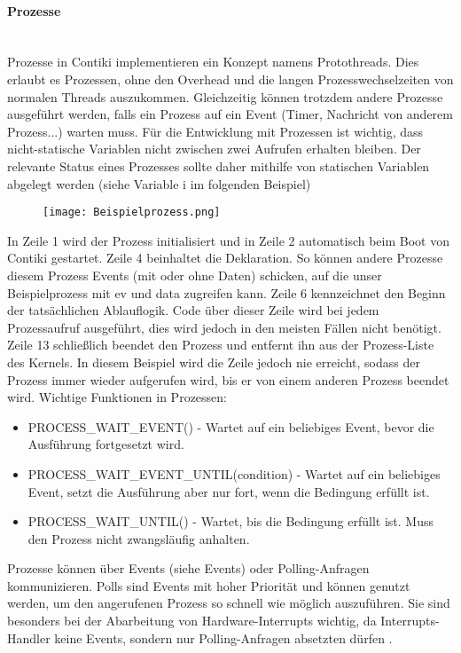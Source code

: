 \paragraph{Prozesse}\mbox{}\\
Prozesse in Contiki implementieren ein Konzept namens Protothreads. Dies erlaubt es Prozessen, ohne den Overhead und die langen 
Prozesswechselzeiten von normalen Threads auszukommen. Gleichzeitig k\"onnen trotzdem andere Prozesse ausgef\"uhrt werden, falls ein Prozess auf ein Event (Timer, Nachricht von anderem Prozess...) warten muss.
F\"ur die Entwicklung mit Prozessen ist wichtig, dass nicht-statische Variablen nicht zwischen zwei Aufrufen erhalten bleiben.
Der relevante Status eines Prozesses sollte daher mithilfe von statischen Variablen abgelegt werden (siehe Variable i im folgenden Beispiel)

\begin{figure}[h!]
	\centering
		\texttt{[image: Beispielprozess.png]}
	\label{Beispielprozess}
\end{figure}
In Zeile 1 wird der Prozess initialisiert und in Zeile 2 automatisch beim Boot von Contiki gestartet. Zeile 4 beinhaltet die
Deklaration. So k\"onnen andere Prozesse diesem Prozess Events (mit oder ohne Daten) schicken, auf die unser Beispielprozess 
mit ev und data zugreifen kann. Zeile 6 kennzeichnet den Beginn der tats\"achlichen Ablauflogik. Code \"uber dieser Zeile wird 
bei jedem Prozessaufruf ausgef\"uhrt, dies wird jedoch in den meisten F\"allen nicht ben\"otigt. Zeile 13 schlie{\ss}lich beendet
den Prozess und entfernt ihn aus der Prozess-Liste des Kernels. In diesem Beispiel wird die Zeile jedoch nie erreicht, sodass der Prozess immer wieder aufgerufen wird, bis er von einem anderen Prozess beendet wird.
Wichtige Funktionen in Prozessen:
\begin{itemize}
\item PROCESS\_WAIT\_EVENT() - Wartet auf ein beliebiges Event, bevor die Ausf\"{u}hrung fortgesetzt wird.
\item PROCESS\_WAIT\_EVENT\_UNTIL(condition) - Wartet auf ein beliebiges Event, setzt die Ausf\"{u}hrung aber nur fort, wenn die Bedingung erf\"{u}llt ist.
\item PROCESS\_WAIT\_UNTIL() - Wartet, bis die Bedingung erf\"ullt ist. Muss den Prozess nicht zwangsl\"{a}ufig anhalten.
\end{itemize}
Prozesse k\"onnen \"uber Events (siehe Events) oder Polling-Anfragen kommunizieren.  Polls sind Events mit hoher Priorit\"at und 
k\"onnen genutzt werden, um den angerufenen Prozess so schnell wie m\"oglich auszuf\"uhren. Sie
sind besonders bei der Abarbeitung von Hardware-Interrupts wichtig, da Interrupts-Handler keine Events, sondern nur
Polling-Anfragen absetzten d\"urfen \cite[vgl.][S. 7]{Walter:2010}.

